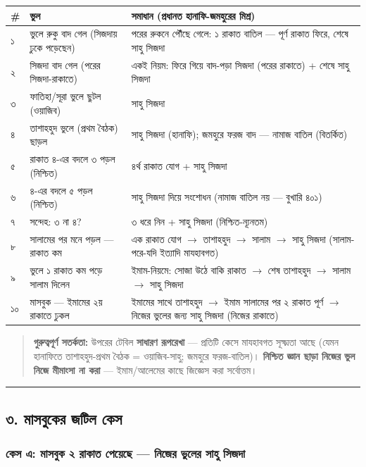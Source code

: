\begin{table}[h]\centering\small
\begin{tabular}{lll}
\# & ভুল & সমাধান (প্রধানত হানাফি-জমহুরের মিশ্র) \\
\hline
১ & ভুলে রুকু বাদ গেল (সিজদায় ঢুকে পড়েছেন) & পরের রুকনে পৌঁছে গেলে: ১ রাকাত বাতিল — পূর্ণ রাকাত ফিরে, শেষে সাহু সিজদা \\
২ & সিজদা বাদ গেল (পরের সিজদা-রাকাতে) & একই নিয়ম: ফিরে গিয়ে বাদ-পড়া সিজদা (পরের রাকাতে) + শেষে সাহু সিজদা \\
৩ & ফাতিহা/সূরা ভুলে ছুটল (ওয়াজিব) & সাহু সিজদা \\
৪ & তাশাহহুদ ভুলে (প্রথম বৈঠক) ছাড়ল & সাহু সিজদা (হানাফি); জমহুরে ফরজ বাদ — নামাজ বাতিল (বিতর্কিত) \\
৫ & রাকাত ৪-এর বদলে ৩ পড়ল (নিশ্চিত) & ৪র্থ রাকাত যোগ + সাহু সিজদা \\
৬ & ৪-এর বদলে ৫ পড়ল (নিশ্চিত) & সাহু সিজদা দিয়ে সংশোধন (নামাজ বাতিল নয় — বুখারি ৪০১) \\
৭ & সন্দেহ: ৩ না ৪? & ৩ ধরে নিন + সাহু সিজদা (নিশ্চিত-ন্যূনতম) \\
৮ & সালামের পর মনে পড়ল — রাকাত কম & এক রাকাত যোগ $\rightarrow$ তাশাহহুদ $\rightarrow$ সালাম $\rightarrow$ সাহু সিজদা (সালাম-পরে-যদি ইত্যাদি মাযহাবগত) \\
৯ & ভুলে ১ রাকাত কম পড়ে সালাম দিলেন & ইমাম-নিয়মে: সোজা উঠে বাকি রাকাত $\rightarrow$ শেষ তাশাহহুদ $\rightarrow$ সালাম $\rightarrow$ সাহু সিজদা \\
১০ & মাসবুক — ইমামের ২য় রাকাতে ঢুকল & ইমামের সাথে তাশাহহুদ $\rightarrow$ ইমাম সালামের পর ২ রাকাত পূর্ণ $\rightarrow$ নিজের ভুলের জন্য সাহু সিজদা (নিজের রাকাতে) \\
\hline
\end{tabular}
\end{table}

\begin{quote}
 \textbf{গুরুত্বপূর্ণ সতর্কতা:} উপরের টেবিল \textbf{সাধারণ রূপরেখা} — প্রতিটি কেসে মাযহাবগত সূক্ষ্মতা আছে (যেমন হানাফিতে তাশাহহুদ-প্রথম বৈঠক = ওয়াজিব-সাহু; জমহুরে ফরজ-বাতিল)। \textbf{নিশ্চিত জ্ঞান ছাড়া নিজের ভুল নিজে মীমাংসা না করা} — ইমাম/আলেমের কাছে জিজ্ঞেস করা সর্বোত্তম।
\end{quote}

\medskip\hrule\medskip

\subsection*{৩. মাসবুকের জটিল কেস}

\subsubsection*{কেস এ: মাসবুক ২ রাকাত পেয়েছে — নিজের ভুলের সাহু সিজদা}

